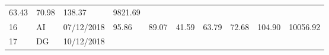 \documentclass[
  11pt,
]{article}
\begin{document}
\begin{longtable}[]{@{}llllllllll@{}}
\begin{minipage}[t]{0.07\columnwidth}
63.43\strut
\end{minipage} & \begin{minipage}[t]{0.07\columnwidth}\raggedright
70.98\strut
\end{minipage} & \begin{minipage}[t]{0.08\columnwidth}\raggedright
138.37\strut
\end{minipage} & \begin{minipage}[t]{0.09\columnwidth}\raggedright
9821.69\strut
\end{minipage}\tabularnewline
\begin{minipage}[t]{0.05\columnwidth}\raggedright
16\strut
\end{minipage} & \begin{minipage}[t]{0.07\columnwidth}\raggedright
AI\strut
\end{minipage} & \begin{minipage}[t]{0.11\columnwidth}\raggedright
07/12/2018\strut
\end{minipage} & \begin{minipage}[t]{0.07\columnwidth}\raggedright
95.86\strut
\end{minipage} & \begin{minipage}[t]{0.07\columnwidth}\raggedright
89.07\strut
\end{minipage} & \begin{minipage}[t]{0.07\columnwidth}\raggedright
41.59\strut
\end{minipage} & \begin{minipage}[t]{0.07\columnwidth}\raggedright
63.79\strut
\end{minipage} & \begin{minipage}[t]{0.07\columnwidth}\raggedright
72.68\strut
\end{minipage} & \begin{minipage}[t]{0.08\columnwidth}\raggedright
104.90\strut
\end{minipage} & \begin{minipage}[t]{0.09\columnwidth}\raggedright
10056.92\strut
\end{minipage}\tabularnewline
\begin{minipage}[t]{0.05\columnwidth}\raggedright
17\strut
\end{minipage} & \begin{minipage}[t]{0.07\columnwidth}\raggedright
DG\strut
\end{minipage} & \begin{minipage}[t]{0.11\columnwidth}\raggedright
10/12/2018\strut
\end{minipage} & \begin{minipage}[t]{0.07\columnwidth}\raggedright

\end{minipage}
\end{longtable}
\end{document}
